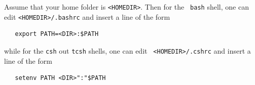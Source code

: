 \documentclass{article}
\begin{document}
Assume that your home folder is {\tt <HOMEDIR>}. Then for the {\tt
bash} shell, one can edit {\tt <HOMEDIR>/.bashrc} and insert a line of
the form
\begin{verbatim}
   export PATH=<DIR>:$PATH
\end{verbatim}
while for the {\tt csh} out {\tt tcsh} shells, one can edit {\tt
<HOMEDIR>/.cshrc} and insert a line of the form
\begin{verbatim}
   setenv PATH <DIR>":"$PATH
\end{verbatim}
\end{document}

